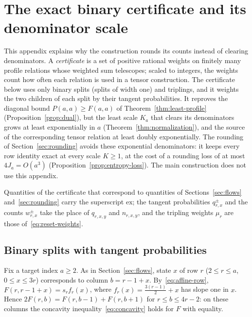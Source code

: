 \section{The exact binary certificate and its denominator scale}
\label{sec:exact-certificate}

This appendix explains why the construction rounds its counts instead of
clearing denominators. A \emph{certificate} is a set of positive rational
weights on finitely many profile relations whose weighted sum telescopes;
scaled to integers, the weights count how often each relation is used in
a tensor construction. The certificate below uses only binary splits
(splits of width one) and triplings, and it weights the two children of
each split by their tangent probabilities. It reproves the diagonal bound
\(P(a,a)\ge F(a,a)\) of Theorem~\ref{thm:least-profile}
(Proposition~\ref{prop:dual}), but the least scale \(K_a\) that clears
its denominators grows at least exponentially in \(a\)
(Theorem~\ref{thm:normalization}), and the source of the corresponding
tensor relation at least doubly exponentially. The rounding of
Section~\ref{sec:rounding} avoids these exponential denominators: it
keeps every row identity exact at every scale \(K\ge1\), at the cost of a
rounding loss of at most \(4J_a=O(a^3)\)
(Proposition~\ref{prop:entropy-loss}). The main construction does not
use this appendix.

Quantities of the certificate that correspond to quantities of
Sections~\ref{sec:flows} and~\ref{sec:rounding} carry the superscript
\(\mathrm{ex}\); the tangent probabilities \(q^\pm_{r,x}\) and the counts
\(w^\pm_{r,x}\) take the place of \(q_{r,x,y}\) and \(n_{r,x,y}\), and the
tripling weights \(\mu_r\) are those of~\eqref{eq:reset-weights}.

\subsection{Binary splits with tangent probabilities}

Fix a target index \(a\ge2\). As in Section~\ref{sec:flows}, state \(x\)
of row \(r\) (\(2\le r\le a\), \(0\le x\le3r\)) corresponds to column
\(b=r-1+x\). By~\eqref{eq:affine-row}, \(F(r,r-1+x)=s_rf_r(x)\), where
\(f_r(x)=\frac{3(r-1)}2+x\) has slope one in \(x\). Hence
\(2F(r,b)=F(r,b-1)+F(r,b+1)\) for \(r\le b\le4r-2\): on these columns
the concavity inequality~\eqref{eq:concavity} holds for \(F\) with
equality.

